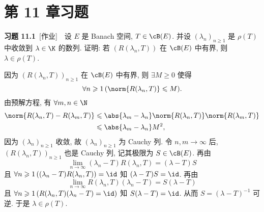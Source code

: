 \section{第 11 章习题}
	\textbf{习题 11.1}\ [作业]\ \ 设 $ E $ 是 Banach 空间, $ T\in\cB(E) $. 并设 $ (\lambda_{n})_{n\geqslant1} $ 是 $ \rho(T) $ 中收敛到 $ \lambda\in\K $ 的数列. 证明: 若 $ (R(\lambda_{n}, T)) $ 在 $ \cB(E) $ 中有界, 则 $ \lambda\in\rho(T) $.
	\begin{answer}
		因为 $ (R(\lambda_{n}, T))_{n\geqslant1} $ 在 $ \cB(E) $ 中有界, 则 $ \exists M\geqslant0 $ 使得
		\[
			\forall n\geqslant1\,(\norm{R(\lambda_{n}, T)}\leqslant M).
		\]
		由预解方程, 有 $ \forall m, n\in\N $
		\[
			\begin{aligned}
				\norm{R(\lambda_{n}, T)-R(\lambda_{m}, T)} & \leqslant \abs{\lambda_{m}-\lambda_{n}}\norm{R(\lambda_{n}, T)}\norm{R(\lambda_{m}, T)}\\
				& \leqslant\abs{\lambda_{m}-\lambda_{n}}M^{2},
			\end{aligned}
		\]
		因为 $ (\lambda_{n})_{n\geqslant1} $ 收敛, 故 $ (\lambda_{n})_{n\geqslant1} $ 为 Cauchy 列. 令 $ n, m\to\infty $ 后, $ (R(\lambda_{n}, T))_{n\geqslant1} $ 也是 Cauchy 列, 记其极限为 $ S\in\cB(E) $. 再由
		\[
			\lim_{n\to\infty}(\lambda_{n}-T)R(\lambda_{n}, T)=(\lambda-T)S
		\]
		且 $ \forall n\geqslant1\,((\lambda_{n}-T)R(\lambda_{n}, T))=\id $ 知 $ (\lambda-T)S=\id $. 再由
		\[
			\lim_{n\to\infty} R(\lambda_{n}, T)(\lambda_{n}-T)=S(\lambda-T)
		\]
		且 $ \forall n\geqslant1\,(R(\lambda_{n}, T)(\lambda_{n}-T)=\id) $ 知 $ S(\lambda-T)=\id $. 从而 $ S=(\lambda-T)^{-1} $ 可逆. 于是 $ \lambda\in\rho(T) $.\qedhere
	\end{answer}

